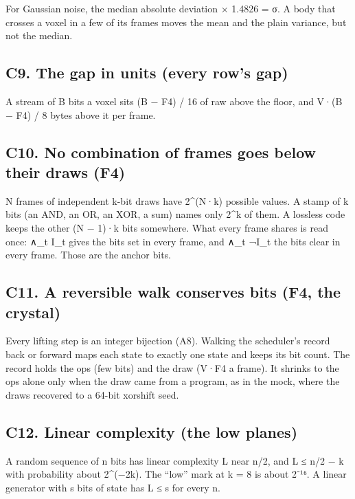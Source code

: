For Gaussian noise, the median absolute deviation × 1.4826 = σ. A body that crosses a voxel in a few of its frames moves the mean and the plain variance, but not the median.

\subsection{\texorpdfstring{C9. The gap in units (every row's gap)}{C9. The gap in units (every row's gap)}}

A stream of B bits a voxel sits (B − F4) / 16 of raw above the floor, and V·(B − F4) / 8 bytes above it per frame.

\subsection{\texorpdfstring{C10. No combination of frames goes below their draws (F4)}{C10. No combination of frames goes below their draws (F4)}}

N frames of independent k-bit draws have 2\textasciicircum{}(N·k) possible values. A stamp of k bits (an AND, an OR, an XOR, a sum) names only 2\textasciicircum{}k of them. A lossless code keeps the other (N − 1)·k bits somewhere. What every frame shares is read once: ∧\_\allowbreak{}t I\_\allowbreak{}t gives the bits set in every frame, and ∧\_\allowbreak{}t ¬I\_\allowbreak{}t the bits clear in every frame. Those are the anchor bits.

\subsection{\texorpdfstring{C11. A reversible walk conserves bits (F4, the crystal)}{C11. A reversible walk conserves bits (F4, the crystal)}}

Every lifting step is an integer bijection (A8). Walking the scheduler's record back or forward maps each state to exactly one state and keeps its bit count. The record holds the ops (few bits) and the draw (V·F4 a frame). It shrinks to the ops alone only when the draw came from a program, as in the mock, where the draws recovered to a 64-bit xorshift seed.

\subsection{\texorpdfstring{C12. Linear complexity (the low planes)}{C12. Linear complexity (the low planes)}}

A random sequence of n bits has linear complexity L near n/2, and L ≤ n/2 − k with probability about 2\textasciicircum{}(−2k). The “low” mark at k = 8 is about 2⁻¹⁶. A linear generator with s bits of state has L ≤ s for every n.

